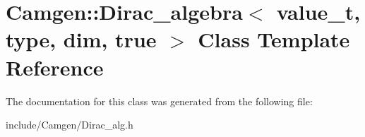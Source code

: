 \hypertarget{a00130}{\section{Camgen\-:\-:Dirac\-\_\-algebra$<$ value\-\_\-t, type, dim, true $>$ Class Template Reference}
\label{a00130}
}


The documentation for this class was generated from the following file\-:\begin{DoxyCompactItemize}
\item 
include/\-Camgen/Dirac\-\_\-alg.\-h\end{DoxyCompactItemize}
